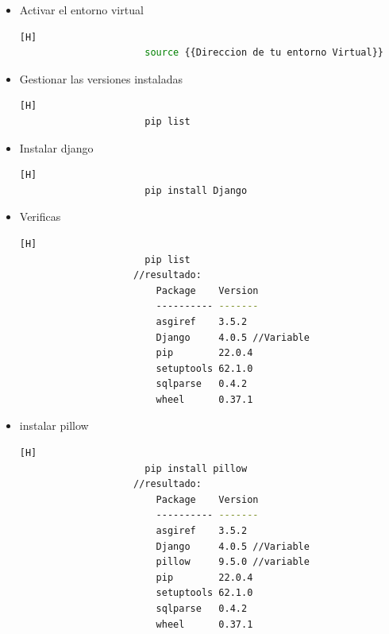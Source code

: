 \documentclass{article}
\begin{document}
    \begin{itemize}
        \item Activar el entorno virtual
        \begin{lstlisting}[language=bash,caption={Entorno de Linux-Ejecute el script de activación para activar el entorno virtual:}][H]
    		          source {{Direccion de tu entorno Virtual}}
    	\end{lstlisting}
         \item Gestionar las versiones instaladas
        \begin{lstlisting}[language=bash,caption={Entorno de Linux-Ejecute el script de activación para activar el entorno virtual:}][H]
    		          pip list
    	\end{lstlisting}
        \item Instalar django
        \begin{lstlisting}[language=bash,caption={Entorno de Linux-Ejecute el script de activación para activar el entorno virtual:}][H]
    		          pip install Django
    	\end{lstlisting}
        \item Verificas
        \begin{lstlisting}[language=bash,caption={Entorno de Linux-Ejecute el script de activación para activar el entorno virtual:}][H]
    		          pip list
                    //resultado:
                        Package    Version
                        ---------- -------
                        asgiref    3.5.2
                        Django     4.0.5 //Variable
                        pip        22.0.4
                        setuptools 62.1.0
                        sqlparse   0.4.2
                        wheel      0.37.1
    	\end{lstlisting}
        \item instalar pillow
        \begin{lstlisting}[language=bash,caption={Entorno de Linux-Ejecute el script de activación para activar el entorno virtual:}][H]
    		          pip install pillow
                    //resultado:
                        Package    Version
                        ---------- -------
                        asgiref    3.5.2
                        Django     4.0.5 //Variable
                        pillow     9.5.0 //variable
                        pip        22.0.4
                        setuptools 62.1.0
                        sqlparse   0.4.2
                        wheel      0.37.1
    	\end{lstlisting}

\end{itemize}
\end{document}
